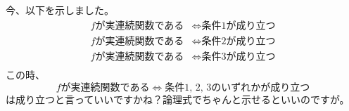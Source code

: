 \documentclass[12pt]{jarticle}
\numberwithin{equation}{section}    %
\numberwithin{figure}{section}      %
\numberwithin{table}{section}      %
\begin{document}
今、以下を示しました。
\begin{align}
    f\text{が実連続関数である} & \iff \text{条件1が成り立つ} \\
    f\text{が実連続関数である} & \iff \text{条件2が成り立つ} \\
    f\text{が実連続関数である} & \iff \text{条件3が成り立つ} \\
\end{align}
この時、
\begin{equation}
    f\text{が実連続関数である} \iff \text{条件1, 2, 3のいずれかが成り立つ}
\end{equation}
は成り立つと言っていいですかね？論理式でちゃんと示せるといいのですが。
\end{document}
